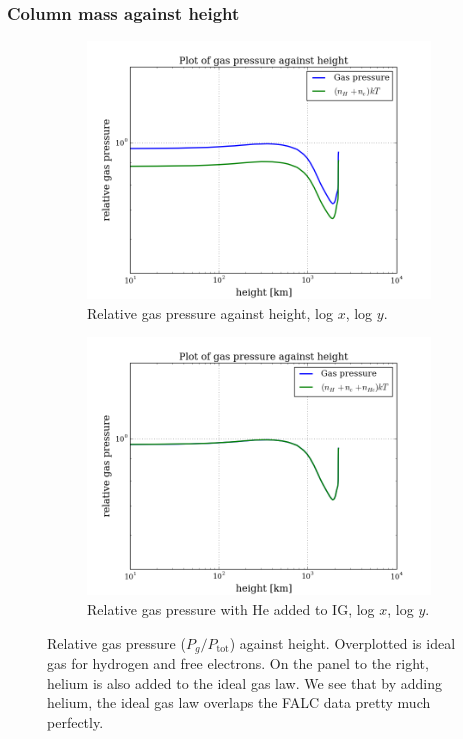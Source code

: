 \documentclass{article}
\begin{document}
\subsubsection{Column mass against height}
\begin{figure}[H]
  \centering
  \begin{subfigure}{0.49\textwidth}
    \includegraphics[scale=0.37]{../figures/falc/falc_h_pgas_1.png}
    \caption{Relative gas pressure against height, log $x$, log $y$.}
  \end{subfigure}
  \begin{subfigure}{0.49\textwidth}
    \includegraphics[scale=0.37]{../figures/falc/falc_h_pgas_2.png}
    \caption{Relative gas pressure with He added to IG, log $x$, log $y$.}
  \end{subfigure}
  \caption{Relative gas pressure ($P_{g}/P_{\text{tot}}$) against height. Overplotted is ideal gas for hydrogen and free electrons. On the panel to the right, helium is also added to the ideal gas law. We see that by adding helium, the ideal gas law overlaps the FALC data pretty much perfectly.}
\end{figure}
\end{document}
